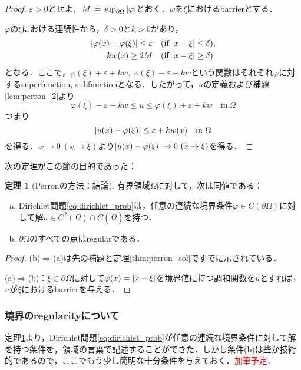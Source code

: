 \documentclass[a4paper]{ltjsarticle}
\newcommand{\Om}{\Omega}
\newcommand{\pOm}{\partial\Omega}
\newcommand{\Ombar}{\overline{\Omega}}
\newcommand{\inn}{\quad\text{in}\ }
\newcommand{\1}{\mathbbm{1}}
\numberwithin{equation}{section}
\theoremstyle{definition}
\newtheorem{thm}{定理}[section]
\begin{document}
\begin{proof}
    $\varepsilon>0$とせよ．$M\coloneqq\sup_{\pOm}\abs{\varphi}$とおく．$w$を$\xi$におけるbarrierとする．

    $\varphi$の$\xi$における連続性から，$\delta>0$と$k>0$があり，
    \begin{align}
        \abs{\varphi(x)-\varphi(\xi)}\leq \varepsilon &\quad (\text{if $\abs{x-\xi}\leq\delta$}),\\
        kw(x) \geq 2M &\quad (\text{if $\abs{x-\xi}\geq\delta$})
    \end{align}
    となる．ここで，$\varphi(\xi)+\varepsilon+kw,\ \varphi(\xi)-\varepsilon-kw$という関数はそれぞれ$\varphi$に対するsuperfunction, subfunctionとなる．したがって，$u$の定義および補題\ref{lem:perron_2}より
    \begin{equation}
        \varphi(\xi)-\varepsilon-kw\leq u\leq \varphi(\xi)+\varepsilon+kw\inn \Om 
    \end{equation}
    つまり
    \begin{equation}
        \abs{u(x)-\varphi(\xi)}\leq \varepsilon+kw(x) \inn\Om 
    \end{equation}
    を得る．$w\to0\ (x\to \xi)$より$\abs{u(x)-\varphi(\xi)}\to0\ (x\to \xi)$を得る．
\end{proof}
次の定理がこの節の目的であった：
\begin{thm}[Perronの方法：結論]\label{thm:perron_concluded}
    有界領域$\Om$に対して，次は同値である：
    \begin{enumerate}[(a)]
        \item Dirichlet問題\eqref{eq:dirichlet_prob}は，任意の連続な境界条件$\varphi\in C(\pOm)$に対して解$u\in C^2(\Om)\cap C(\Ombar)$を持つ．
        \item $\pOm$のすべての点はregularである．
    \end{enumerate}
\end{thm}
\begin{proof}
    (b)$\Longrightarrow$(a)は先の補題と定理\ref{thm:perron_sol}ですでに示されている．

    (a)$\Longrightarrow$(b)：$\xi\in\pOm$に対して$\varphi(x)=\abs{x-\xi}$を境界値に持つ調和関数を$u$とすれば，$u$が$\xi$におけるbarrierを与える．
\end{proof}
\subsubsection{境界のregularityについて}
定理\ref{thm:perron_concluded}より，Dirichlet問題\eqref{eq:dirichlet_prob}が任意の連続な境界条件に対して解を持つ条件を，領域の言葉で記述することができた．しかし条件(b)は些か技術的であるので，ここでもう少し簡明な十分条件を与えておく．\textcolor{red}{加筆予定．}
\end{document}

